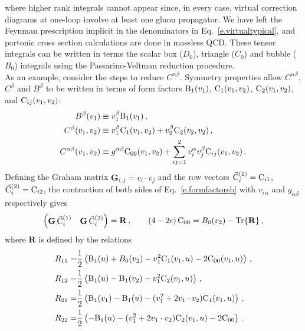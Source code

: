 \documentclass[prd,preprintnumbers,nofootinbib,superscriptaddress,onecolumn,preprint]{revtex4-1}
\newcommand\3[1]{\boldsymbol{#1}}
\begin{document}
%
where higher rank integrals cannot appear since, in every case,
virtual correction diagrams at one-loop involve at least one gluon
propagator.  We have left the Feynman prescription implicit in the
denominators in  Eq.~\eqref{e.virtualtypical}, and partonic cross
section calculations are done in massless QCD.  These tensor integrals
can be written in terms the scalar box ($D_0$), triangle ($C_0$) and
bubble ($B_0$) integrals using the Passarino-Veltman reduction
procedure\cite{Passarino:1978jh}. \\

As an example, consider the steps to reduce $C^{\alpha\beta}$.
Symmetry properties allow $C^{\alpha\beta}$, $C^{\beta}$ and
$B^{\beta}$ to be written in terms of form factors ${\rm B}_1(v_1)$,
${\rm C}_1(v_1,v_2)$,  ${\rm C}_2(v_1,v_2)$, and ${\rm C}_{ij}(v_1,v_2)$:
%
\begin{subequations}
\begin{align}
B^{\beta}(v_1)     & \equiv v_1^\beta {\rm B}_1(v_1) \,,\\
\label{e.formfactorsa}
C^{\beta}(v_1,v_2) & \equiv v_1^\beta {\rm C}_1(v_1,v_2) + v_2^\beta {\rm C}_2(v_2,v_2) \, ,\\
C^{\alpha\beta}(v_1,v_2) &\equiv g^{\alpha\beta} {\rm C}_{00}(v_1,v_2) 
                          +\sum_{ij=1}^2v_i^\alpha v_j^\beta {\rm C}_{ij}(v_1,v_2) \,.
\label{e.formfactorsb}
\end{align}
\end{subequations}
%
Defining the Graham matrix $\mathbf{G}_{i,j}=v_i\cdot v_j$ and the row
vectors $\vec{{\rm C}}^{(1)}_{i}={\rm C}_{i1}$, $\vec{{\rm
C}}^{(2)}_{i}={\rm C}_{i2}$, the contraction of both sides of
Eq.~\eqref{e.formfactorsb} with $v_i{}_\alpha$ and $g_{\alpha \beta}$
respectively gives
%
\begin{align}\label{e.PVlineareqs}
\begin{pmatrix}
\mathbf{G}\,\vec{{\rm C}}^{(1)}_{i}&\mathbf{G}\,\vec{{\rm C}}^{(2)}_{i} 
\end{pmatrix}
=\mathbf{R}\,,\qquad (4-2\epsilon) \,{\rm C}_{00}=B_0(v_2)-{\rm Tr}\{\mathbf{R}\}\,,
\end{align}
%
where $\mathbf{R}$ is defined by the relations
%
\begin{align}\label{e.rhs}
R_{11}=&\frac{1}{2}\left({\rm B}_1(u)
                         +B_0(v_2)
                         -v_1^2{\rm C}_1(v_1,u)
                         -2{\rm C}_{00}(v_1,u)
                    \right) \, , \nonumber \\
R_{12}=&\frac{1}{2}\left( {\rm B}_1(u)
                         -{\rm B}_1(v_2)
                         -v_1^2{\rm C}_2(v_1,u)
                    \right) \, , \nonumber \\
R_{21}=&\frac{1}{2}\left( {\rm B}_1(v_1)
                         -{\rm B}_1(u)-(v_1^2+2v_1\cdot v_2){\rm C}_1(v_1,u)
                   \right) \, , \nonumber\\
R_{22}=&\frac{1}{2}\left(-{\rm B}_1(u)
                         -(v_1^2+2v_1\cdot v_2){\rm C}_2(v_1,u)
                         -2{\rm C}_{00}\right)\, .
\end{align}
\end{document}
